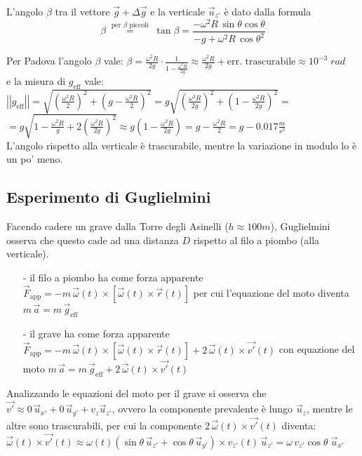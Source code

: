 \documentclass[a4paper]{article}
\newcommand\uz{\vec{u}_z}
\newcommand\uxp{\vec{u}_{x'}}
\newcommand\uyp{\vec{u}_{y'}}
\newcommand\uzp{\vec{u}_{z'}}
\newcommand\vmod[1]{\left|\left|{#1}\right|\right|}
\begin{document}
L'angolo \(\beta\) tra il vettore \(\vec{g} + \Delta \vec{g}\) e la verticale \(\uzp\) è dato dalla formula
\[\beta \; \stackrel{\text{per } \beta \text{ piccoli}}{=} \; \tan \beta = \frac{-\omega^2 R \, \sin \theta \cos \theta}{-g + \omega^2 R \, {\cos \theta}^2}\]

Per Padova l'angolo \(\beta\) vale: \(\beta = \frac{\omega^2 R}{2g} \cdot \frac{1}{1 - \frac{\omega^2 R}{2g}} \approx \frac{\omega^2 R}{2g} + \text{err. trascurabile} \approx 10^{-3} \; rad\) \\
e la misura di \(g_\text{eff}\) vale: \(\vmod{g_\text{eff}} = \sqrt{\left( \frac{\omega^2 R}{2} \right)^2 + \left( g - \frac{\omega^2 R}{2} \right)^2} = g \sqrt{\left( \frac{\omega^2 R}{2g} \right)^2 + \left( 1 - \frac{\omega^2 R}{2g} \right)^2} = \) \\
\(= g \sqrt{1- \frac{\omega^2 R}{g} + 2 \left( \frac{\omega^2 R}{2g} \right)^2} \approx g (1 - \frac{\omega^2 R}{2g}) = g - \frac{\omega^2 R}{2} = g - 0.017 \frac{m}{s^2}\) \\
L'angolo rispetto alla verticale è trascurabile, mentre la variazione in modulo lo è un po' meno.

\newpage

\subsection{Esperimento di Guglielmini}
Facendo cadere un grave dalla Torre degli Asinelli (\(h \approx 100 m\)), Guglielmini osserva che questo cade ad una distanza \(D\)
rispetto al filo a piombo (alla verticale).
\begin{itemize}[topsep=3pt, itemsep=0pt]
	\item[-] il filo a piombo ha come forza apparente \(\vec{F}_\text{app} = -m \, \vec{\omega}(t) \times [\vec{\omega}(t) \times \vec{r}(t)]\)
	per cui l'equazione del moto diventa \(m \, \vec{a} = m \, \vec{g}_\text{eff}\)
	\item[-] il grave ha come forza apparente \(\vec{F}_\text{app} = -m \, \vec{\omega}(t) \times [\vec{\omega}(t) \times \vec{r}(t)] + 2 \, \vec{\omega}(t) \times \vec{v'}(t)\)
	con equazione del moto \(m \, \vec{a} = m \, \vec{g}_\text{eff} + 2 \, \vec{\omega}(t) \times \vec{v'}(t)\)
\end{itemize}

Analizzando le equazioni del moto per il grave si osserva che \(\vec{v'} \approx 0 \, \uxp + 0 \, \uyp + v_z \uzp\), ovvero la componente
prevalente è lungo \(\uz\), mentre le altre sono trascurabili, per cui la componente \(2 \, \vec{\omega}(t) \times \vec{v'}(t)\)
diventa: \(\vec{\omega}(t) \times \vec{v'}(t) \approx \omega(t)(\sin \theta \, \uzp + \cos \theta \, \uyp) \times v_{z'}(t) \, \uzp = \omega \, v_{z'} \cos \theta \; \uxp\)
\end{document}
